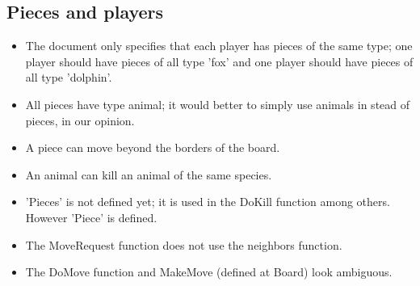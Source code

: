 \documentclass[a4paper,11pt]{article}
\begin{document}
    \subsection{Pieces and players}
    \begin{itemize}
        \item The document only specifies that each player has pieces of the same type; one player should have pieces of all type 'fox' and one player should have pieces of all type 'dolphin'.
        \item All pieces have type animal; it would better to simply use animals in stead of pieces, in our opinion.
        \item A piece can move beyond the borders of the board.
        \item An animal can kill an animal of the same species.
        \item 'Pieces' is not defined yet; it is used in the DoKill function among others. However 'Piece' is defined.
        \item The MoveRequest function does not use the neighbors function.
        \item The DoMove function and MakeMove (defined at Board) look ambiguous.
    \end{itemize}
\end{document}
